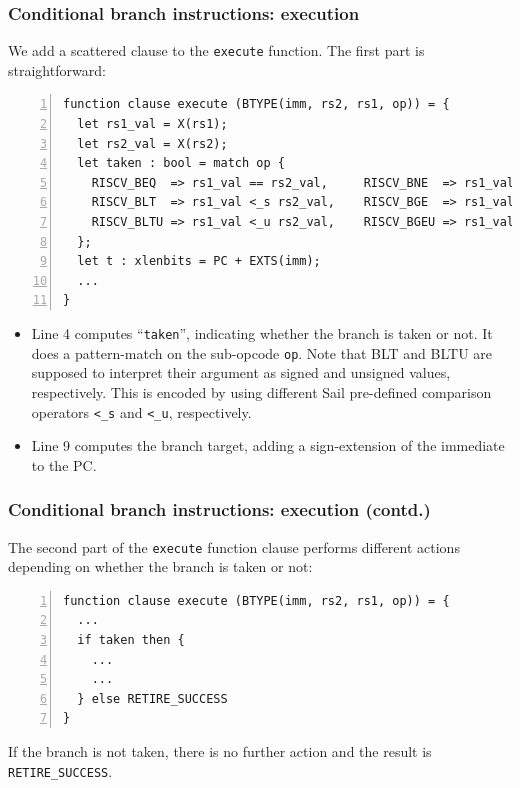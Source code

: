 \documentclass[aspectratio=169]{beamer}
\newcommand{\slidefont}{\scriptsize}
\newcommand{\cf}{\scriptsize\tt}
\begin{document}
\begin{frame}[fragile]
  \frametitle{Conditional branch instructions: execution}

  \slidefont

  We add a scattered clause to the {\cf execute} function.  The first part is straightforward:

  \vspace{1ex}

  \begin{Verbatim}[frame=single, numbers=left, label = File riscv\_types.sail]
function clause execute (BTYPE(imm, rs2, rs1, op)) = {
  let rs1_val = X(rs1);
  let rs2_val = X(rs2);
  let taken : bool = match op {
    RISCV_BEQ  => rs1_val == rs2_val,     RISCV_BNE  => rs1_val != rs2_val,
    RISCV_BLT  => rs1_val <_s rs2_val,    RISCV_BGE  => rs1_val >=_s rs2_val,
    RISCV_BLTU => rs1_val <_u rs2_val,    RISCV_BGEU => rs1_val >=_u rs2_val
  };
  let t : xlenbits = PC + EXTS(imm);
  ...
}
  \end{Verbatim}

  \begin{minipage}{\textwidth}
    \begin{itemize}
    \item Line 4 computes ``{\cf taken}'', indicating whether the
      branch is taken or not.  It does a pattern-match on the
      sub-opcode {\cf op}.  Note that BLT and BLTU are supposed to
      interpret their argument as signed and unsigned values,
      respectively.  This is encoded by using different Sail
      pre-defined comparison operators {\cf <\_s} and {\cf <\_u},
      respectively.
    \item Line 9 computes the branch target, adding a sign-extension of the immediate to the PC.
    \end{itemize}
  \end{minipage}


\end{frame}


\begin{frame}[fragile]
  \frametitle{Conditional branch instructions: execution (contd.)}

  \slidefont

  The second part of the {\cf execute} function clause performs
  different actions depending on whether the branch is taken or not:

  \vspace{1ex}

  \begin{Verbatim}[frame=single, numbers=left, label = File riscv\_types.sail]
function clause execute (BTYPE(imm, rs2, rs1, op)) = {
  ...
  if taken then {
    ...
    ...
  } else RETIRE_SUCCESS
}
  \end{Verbatim}

  \begin{minipage}{\textwidth}
    If the branch is not taken, there is no further action and the
    result is {\cf RETIRE\_SUCCESS}.
  \end{minipage}

\end{frame}
\end{document}
